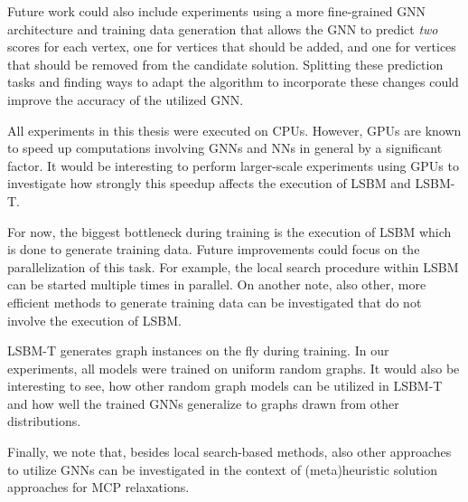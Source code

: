 \documentclass[draft,final]{vutinfth} %
\begin{document}
Future work could also include experiments using a more fine-grained GNN architecture and training data generation that allows the GNN to predict \emph{two} scores for each vertex, one for vertices that should be added, and one for vertices that should be removed from the candidate solution. 
Splitting these prediction tasks and finding ways to adapt the algorithm to incorporate these changes could improve the accuracy of the utilized GNN. 


All experiments in this thesis were executed on CPUs. However, GPUs are known to speed up computations involving GNNs and NNs in general by a significant factor. It would be interesting to perform larger-scale experiments using GPUs to investigate how strongly this speedup affects the execution of LSBM and LSBM-T. 

For now, the biggest bottleneck during training is the execution of LSBM which is done to generate training data. Future improvements could focus on the parallelization of this task. For example, the local search procedure within LSBM can be started multiple times in parallel. 
On another note, also other, more efficient methods to generate training data can be investigated that do not involve the execution of LSBM. 

LSBM-T generates graph instances on the fly during training. In our experiments, all models were trained on uniform random graphs. It would also be interesting to see, how other random graph models can be utilized in LSBM-T and how well the trained GNNs generalize to graphs drawn from other distributions. 

Finally, we note that, besides local search-based methods, also other approaches to utilize GNNs can be investigated in the context of (meta)heuristic solution approaches for MCP relaxations. 

\end{document}
